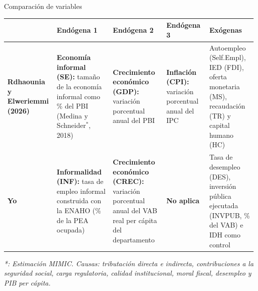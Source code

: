 \documentclass[serif, aspectratio=169]{beamer}
\begin{document}
\begin{frame}{Comparación de variables}
\centering
\footnotesize
\setlength{\tabcolsep}{4pt}
\renewcommand{\arraystretch}{1.3}
\begin{tabular}{|L{2.2cm}|L{2.9cm}|L{2.9cm}|L{2.2cm}|L{3cm}|}
\hline
 & \textbf{Endógena 1} & \textbf{Endógena 2} & \textbf{Endógena 3} & \textbf{Exógenas} \\
\hline
\textbf{Rdhaounia y Elweriemmi (2026)} & \textbf{Economía informal (SE):} tamaño de la economía informal como \% del PBI (Medina y Schneider$^*$, 2018) & \textbf{Crecimiento económico (GDP):} variación porcentual anual del PBI & \textbf{Inflación (CPI):} variación porcentual anual del IPC & Autoempleo (Self.Empl), IED (FDI), oferta monetaria (MS), recaudación (TR) y capital humano (HC) \\
\hline
\textbf{Yo} & \textbf{Informalidad (INF):} tasa de empleo informal construida con la ENAHO (\% de la PEA ocupada) & \textbf{Crecimiento económico (CREC):} variación porcentual anual del VAB real per cápita del departamento & \textbf{No aplica} & Tasa de desempleo (DES), inversión pública ejecutada (INVPUB, \% del VAB) e IDH como control \\
\hline
\end{tabular}

\vspace{0.3cm}
{\tiny \textit{*: Estimación MIMIC. Causas: tributación directa e indirecta, contribuciones a la seguridad social, carga regulatoria, calidad institucional, moral fiscal, desempleo y PIB per cápita.}}
\end{frame}
\end{document}
